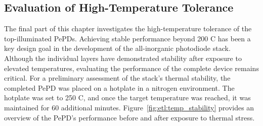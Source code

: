 \subsection{Evaluation of High-Temperature Tolerance}

The final part of this chapter investigates the high-temperature tolerance of the top-illuminated PePDs. Achieving stable performance beyond 200 \degree C has been a key design goal in the development of the all-inorganic photodiode stack. Although the individual layers have demonstrated stability after exposure to elevated temperatures, evaluating the performance of the complete device remains critical. For a preliminary assessment of the stack’s thermal stability, the completed PePD was placed on a hotplate in a nitrogen environment. The hotplate was set to 250 \degree C, and once the target temperature was reached, it was maintained for 60 additional minutes. Figure~\ref{fig:etl:temp_stability} provides an overview of the PePD’s performance before and after exposure to thermal stress.

